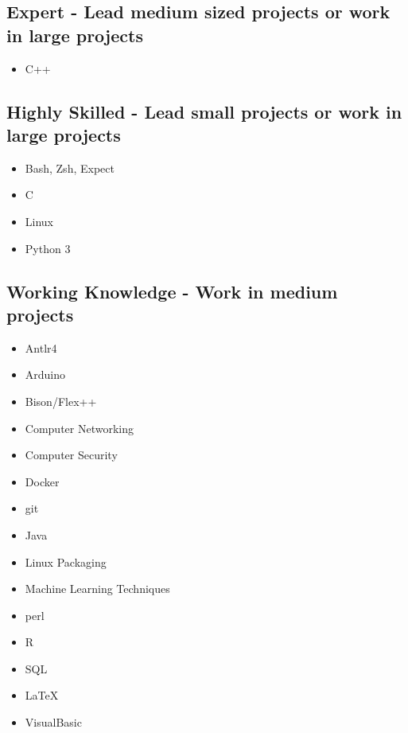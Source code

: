 \documentclass[10pt,a4paper,sans]{moderncv}        %
\begin{document}
\subsection{Expert - Lead medium sized projects or work in large projects}

\begin{multicols}{3}
\begin{itemize}

\item C++

\end{itemize}
\end{multicols}

\subsection{Highly Skilled - Lead small projects or work in large projects}

\begin{multicols}{3}
\begin{itemize}

\item Bash, Zsh, Expect
\item C
\item Linux
\item Python 3

\end{itemize}
\end{multicols}

\subsection{Working Knowledge - Work in medium projects}

\begin{multicols}{3}
\begin{itemize}

\item Antlr4 
\item Arduino
\item Bison/Flex++
\item Computer Networking
\item Computer Security
\item Docker
\item git
\item Java
\item Linux Packaging
\item Machine Learning Techniques
\item perl
\item R
\item SQL
\item { \selectfont  \LaTeX }
\item VisualBasic

\end{itemize}
\end{multicols}
\end{document}
